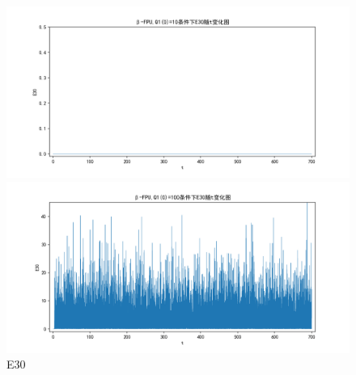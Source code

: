 \documentclass[10pt, a4paper]{article}
\begin{document}
    \begin{figure}[H]
        \begin{minipage}[t]{0.49\textwidth}
            \centering
            \includegraphics[width=\textwidth]{./q6_pics/cmp/E30.png}
        \end{minipage}
        \begin{minipage}[t]{0.49\textwidth}
            \centering
            \includegraphics[width=\textwidth]{./q6_pics/exp/E30.png}
        \end{minipage}
        \caption{E30}\label{fig:E30 in q6}
    \end{figure}
\end{document}
